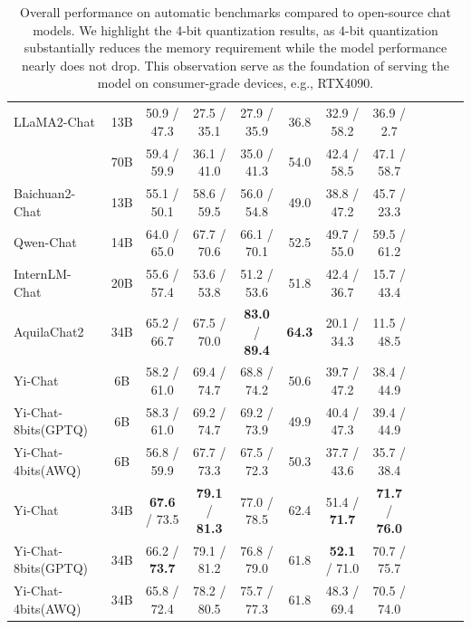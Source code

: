 \begin{table}[t!]
{\begin{tabular}{@{}l c c c c c c c c c c c@{}}
LLaMA2-Chat
& 13B & 50.9 / 47.3 & 27.5 / 35.1 & 27.9 / 35.9 & 36.8 & 32.9 / 58.2 & 36.9 / 2.7 \\
& 70B & 59.4 / 59.9 & 36.1 / 41.0 & 35.0 / 41.3 & 54.0  & 42.4 / 58.5 & 47.1 / 58.7 \\
\gmidrule
Baichuan2-Chat
& 13B & 55.1 / 50.1 & 58.6 / 59.5 & 56.0 / 54.8 & 49.0 & 38.8 / 47.2 & 45.7 / 23.3 \\
\gmidrule
Qwen-Chat
& 14B & 64.0 / 65.0 & 67.7 / 70.6 & 66.1 / 70.1 & 52.5 & 49.7 / 55.0 & 59.5 / 61.2 \\
\gmidrule
InternLM-Chat
& 20B & 55.6 / 57.4 & 53.6 / 53.8 & 51.2 / 53.6 & 51.8 & 42.4 / 36.7 & 15.7 / 43.4 \\
\gmidrule
AquilaChat2
& 34B & 65.2 / 66.7 & 67.5 / 70.0 & \textbf{83.0} / \textbf{89.4} & \textbf{64.3} & 20.1 / 34.3 & 11.5 / 48.5 \\
\gmidrule
Yi-Chat
& 6B & 58.2 / 61.0 & 69.4 / 74.7 & 68.8 / 74.2 & 50.6 & 39.7 / 47.2 & 38.4 / 44.9 \\
Yi-Chat-8bits(GPTQ)
& 6B & 58.3 / 61.0 & 69.2 / 74.7 & 69.2 / 73.9 & 49.9 & 40.4 / 47.3 & 39.4 / 44.9 \\
Yi-Chat-4bits(AWQ)
& 6B & 56.8 / 59.9 & 67.7 / 73.3 & 67.5 / 72.3 & 50.3 & 37.7 / 43.6 & 35.7 / 38.4 \\
\gmidrule
Yi-Chat
& 34B & \textbf{67.6} / 73.5 & \textbf{79.1} / \textbf{81.3} & 77.0 / 78.5 & 62.4 & 51.4 / \textbf{71.7} & \textbf{71.7} / \textbf{76.0} \\
Yi-Chat-8bits(GPTQ)
& 34B & 66.2 / \textbf{73.7} & 79.1 / 81.2 & 76.8 / 79.0 & 61.8 & \textbf{52.1} / 71.0 & 70.7 / 75.7 \\
Yi-Chat-4bits(AWQ)
& 34B & 65.8 / 72.4 & 78.2 / 80.5 & 75.7 / 77.3 & 61.8 & 48.3 / 69.4 & 70.5 / 74.0 \\

\bottomrule

\end{tabular}
}
\caption{Overall performance on automatic benchmarks compared to open-source chat models. We highlight the 4-bit quantization results, as 4-bit quantization substantially reduces the memory requirement while the model performance nearly does not drop. 
This observation serve as the foundation of serving the model on consumer-grade devices, e.g., RTX4090.
}
\label{tab:chat_models}
\end{table}
